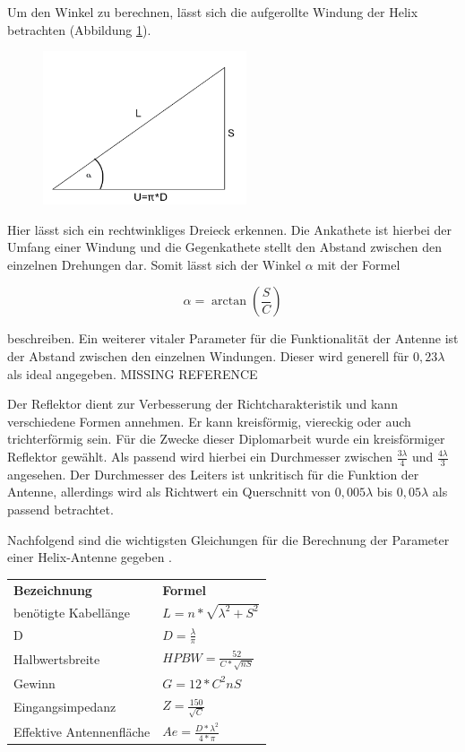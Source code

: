 Um den Winkel zu berechnen, lässt sich die aufgerollte Windung der Helix betrachten (Abbildung \ref{fig:Wndg_aufgerollt}).

\begin{figure}[H]
	\centering
	\includegraphics[width=6cm]{../ref/Windung_aufgerollt.png}
	\label{fig:Wndg_aufgerollt}
\end{figure}

Hier lässt sich ein rechtwinkliges Dreieck erkennen. Die Ankathete ist hierbei der Umfang einer Windung und die Gegenkathete stellt den Abstand zwischen den einzelnen Drehungen dar. Somit lässt sich der Winkel $\alpha$ mit der Formel

\begin{equation}
	\alpha=\arctan(\frac{S}{C})
\end{equation}

beschreiben. Ein weiterer vitaler Parameter für die Funktionalität der Antenne ist der Abstand zwischen den einzelnen Windungen. Dieser wird generell für $0,23\lambda$ als ideal angegeben. MISSING REFERENCE

Der Reflektor dient zur Verbesserung der Richtcharakteristik und kann verschiedene Formen annehmen. Er kann kreisförmig, viereckig oder auch trichterförmig sein. Für die Zwecke dieser Diplomarbeit wurde ein kreisförmiger Reflektor gewählt. Als passend wird hierbei ein Durchmesser zwischen $\frac{3\lambda}{4}$ und $\frac{4\lambda}{3}$ angesehen. Der Durchmesser des Leiters ist unkritisch für die Funktion der Antenne, allerdings wird als Richtwert ein Querschnitt von $0,005\lambda$ bis $0,05\lambda$ als passend betrachtet\cite{Kraus-2002-AntennasB}. 

Nachfolgend sind die wichtigsten Gleichungen für die Berechnung der Parameter einer Helix-Antenne gegeben \cite{Kraus-2002-AntennasB}.

\begin{table}[H]
	\begin{tabular}{|l|l|}

		\textbf{Bezeichnung} & \textbf{Formel}\\ 
		benötigte Kabellänge & $L=n*\sqrt{\lambda^2+S^2}$ \\
		D				     & $D=\frac{\lambda}{\pi}$\\ 
		Halbwertsbreite		 & $HPBW=\frac{52}{C*\sqrt{nS}}$ \\ 
		Gewinn               & $G=12*C^2nS$                 \\ 
		Eingangsimpedanz     & $Z=\frac{150}{\sqrt{C}}$      \\ 
		Effektive Antennenfläche    & $Ae=\frac{D*\lambda^2}{4*\pi}$ \\ 
		\end{tabular}
	\end{table}

